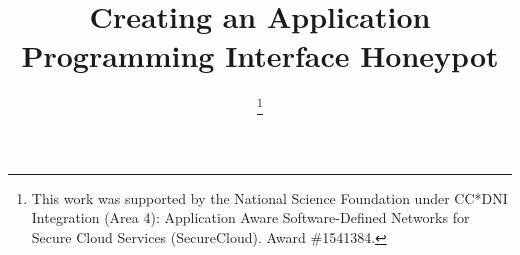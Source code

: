 \documentclass[10pt, conference]{IEEEtran}
\begin{document}
%
\title{Creating an Application Programming Interface Honeypot}


\author{
 \thanks{This work was supported by the National Science Foundation under CC*DNI Integration (Area 4): Application Aware Software-Defined Networks for Secure Cloud Services (SecureCloud). Award \#1541384.}}





% 




\end{document}

